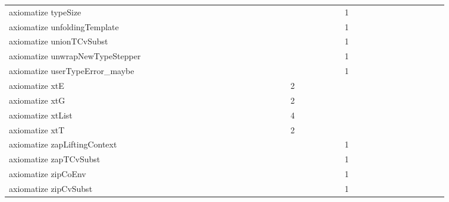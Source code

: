 {\begin{tabular}{l|rrr|rrr|rrr}
axiomatize typeSize &  &  &  &  &  &  &  &  &  &  &  &  &  &  &  &  &  &  &  &  &  &  &  & 1 &  &  &  &  &  &  &  &  &  &  &  & \\
axiomatize unfoldingTemplate &  &  &  &  &  &  &  &  &  &  &  &  &  &  &  &  &  &  &  &  &  &  &  & 1 &  &  &  &  &  &  &  &  &  &  &  & \\
axiomatize unionTCvSubst &  &  &  &  &  &  &  &  &  &  &  &  &  &  &  &  &  &  &  &  &  &  &  & 1 &  &  &  &  &  &  &  &  &  &  &  & \\
axiomatize unwrapNewTypeStepper &  &  &  &  &  &  &  &  &  &  &  &  &  &  &  &  &  &  &  &  &  &  &  & 1 &  &  &  &  &  &  &  &  &  &  &  & \\
axiomatize userTypeError_maybe &  &  &  &  &  &  &  &  &  &  &  &  &  &  &  &  &  &  &  &  &  &  &  & 1 &  &  &  &  &  &  &  &  &  &  &  & \\
axiomatize xtE &  &  &  &  &  &  &  &  &  &  &  &  &  &  &  &  &  & 2 &  &  &  &  &  &  &  &  &  &  &  &  &  &  &  &  &  & \\
axiomatize xtG &  &  &  &  &  &  &  &  &  &  &  &  &  &  &  &  &  & 2 &  &  &  &  &  &  &  &  &  &  &  &  &  &  &  &  &  & \\
axiomatize xtList &  &  &  &  &  &  &  &  &  &  &  &  &  &  &  &  &  & 4 &  &  &  &  &  &  &  &  &  &  &  &  &  &  &  &  &  & \\
axiomatize xtT &  &  &  &  &  &  &  &  &  &  &  &  &  &  &  &  &  & 2 &  &  &  &  &  &  &  &  &  &  &  &  &  &  &  &  &  & \\
axiomatize zapLiftingContext &  &  &  &  &  &  &  &  &  &  &  &  &  &  &  &  &  &  &  &  &  &  &  & 1 &  &  &  &  &  &  &  &  &  &  &  & \\
axiomatize zapTCvSubst &  &  &  &  &  &  &  &  &  &  &  &  &  &  &  &  &  &  &  &  &  &  &  & 1 &  &  &  &  &  &  &  &  &  &  &  & \\
axiomatize zipCoEnv &  &  &  &  &  &  &  &  &  &  &  &  &  &  &  &  &  &  &  &  &  &  &  & 1 &  &  &  &  &  &  &  &  &  &  &  & \\
axiomatize zipCvSubst &  &  &  &  &  &  &  &  &  &  &  &  &  &  &  &  &  &  &  &  &  &  &  & 1 &  &  &  &  &  &  &  &  &  &  &  & \\

\end{tabular}}
